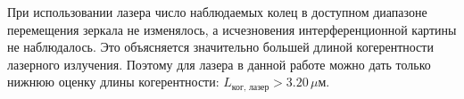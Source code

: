 \documentclass[12pt,a4paper]{article}
\newcommand{\um}{\ensuremath{\,\mu\text{м}}}
\begin{document}
При использовании лазера число наблюдаемых колец в доступном диапазоне перемещения зеркала не изменялось, а исчезновения интерференционной картины не наблюдалось. Это объясняется значительно большей длиной когерентности лазерного излучения. Поэтому для лазера в данной работе можно дать только нижнюю оценку длины когерентности: $L_{\text{ког, лазер}}>3.20\um$.
\end{document}
